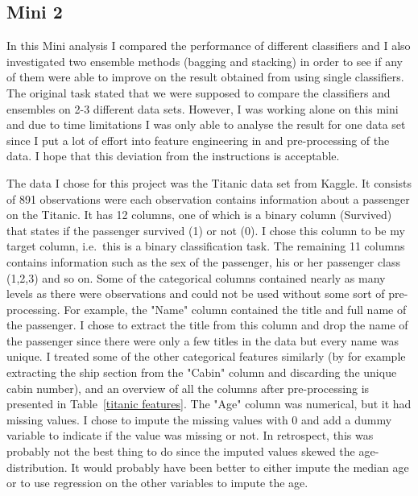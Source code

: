 \documentclass[11pt,twoside,swedish]{article}
\begin{document}
\subsection{Mini 2}\label{Mini 2}
In this Mini analysis I compared the performance of different
classifiers and I also investigated two ensemble methods (bagging and
stacking) in order to see if any of them were able to improve on the
result obtained from using single classifiers. The original task
stated that we were supposed to compare the classifiers and ensembles
on 2-3 different data sets. However, I was working alone on this mini
and due to time limitations I was only able to analyse the result for
one data set since I put a lot of effort into feature engineering in
and pre-processing of the data. I hope that this deviation from the
instructions is acceptable.

The data I chose for this project was the Titanic data set from
Kaggle. It consists of 891 observations were each observation contains
information about a passenger on the Titanic. It has 12 columns, one
of which is a binary column (Survived) that states if the passenger
survived (1) or not (0). I chose this column to be my target column,
i.e.\ this is a binary classification task. The remaining 11 columns
contains information such as the sex of the passenger, his or her
passenger class (1,2,3) and so on. Some of the categorical columns
contained nearly as many levels as there were observations and could
not be used without some sort of pre-processing. For example, the
"Name" column contained the title and full name of the passenger. I
chose to extract the title from this column and drop the name of the
passenger since there were only a few titles in the data but every
name was unique. I treated some of the other categorical features
similarly (by for example extracting the ship section from the "Cabin"
column and discarding the unique cabin number), and an overview of all
the columns after pre-processing is presented in
Table~\ref{titanic features}. The "Age" column was numerical, but it
had missing values. I chose to impute the missing values with 0 and
add a dummy variable to indicate if the value was missing or not. In
retrospect, this was probably not the best thing to do since the
imputed values skewed the age-distribution. It would probably have
been better to either impute the median age or to use regression on
the other variables to impute the age.
\end{document}
